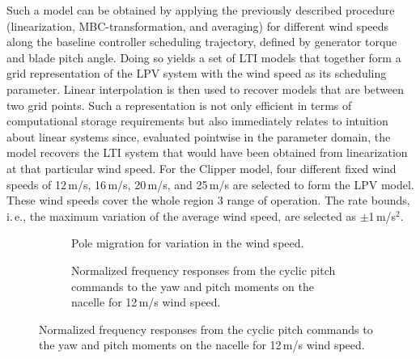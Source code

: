 \documentclass[times]{weauth}
\begin{document}


Such a model can be obtained by applying the previously described procedure (linearization, MBC-transformation, and averaging) for different wind speeds along the baseline controller scheduling trajectory, defined by generator torque and blade pitch angle.
Doing so yields a set of LTI models that together form a grid representation of the LPV system with the wind speed as its scheduling parameter. 
Linear interpolation is then used to recover models that are between two grid points.
Such a representation is not only efficient in terms of computational storage requirements but also immediately relates to intuition about linear systems since, evaluated pointwise in the parameter domain, the model recovers the LTI system that would have been obtained from linearization at that particular wind speed.   
For the Clipper model, four different fixed wind speeds of 12\,m/s, 16\,m/s, 20\,m/s, and 25\,m/s are selected to form the LPV model.
These wind speeds cover the whole region 3 range of operation.
The rate bounds, i.\,e., the maximum variation of the average wind speed, are selected as $\pm$1\,m/s$^2$.


\begin{figure}[hbt]
\begin{subfigure}{0.5\linewidth}
	\centering
	 
	\caption{Pole migration for variation in the wind speed.}
	\label{fig:pz}	
\end{subfigure}
	\hfill
\begin{subfigure}{0.5\linewidth}
		\centering 
		
	\caption{Normalized frequency responses from the cyclic pitch commands to the yaw and pitch moments on the nacelle for 12\,m/s wind speed.}
	\label{fig:linmodl}
\end{subfigure}	
\end{figure}
\end{document}
